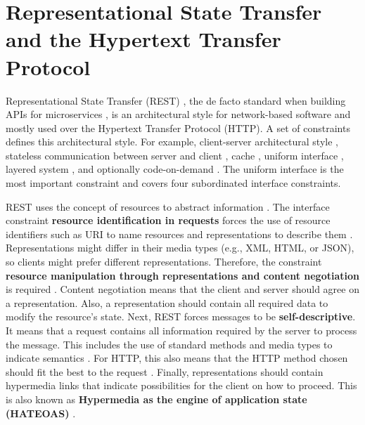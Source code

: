 
\section{Representational State Transfer and the Hypertext Transfer Protocol}
\label{sec:bg_rest_and_http}

Representational State Transfer (REST) \cite{rest_phdthesis}, the de facto standard when building APIs for microservices \cite{martin_fowler_microservices}, is an architectural style for network-based software and mostly used over the Hypertext Transfer Protocol (HTTP). A set of constraints defines this architectural style. For example,  
client-server architectural style \cite[][sec. 5.1.2]{rest_phdthesis}, stateless communication between server and client \cite[][sec. 5.1.3]{rest_phdthesis}, cache \cite[][sec. 5.1.4]{rest_phdthesis}, uniform interface \cite[][sec. 5.1.5]{rest_phdthesis}, layered system \cite[][sec. 5.1.6]{rest_phdthesis}, and optionally code-on-demand \cite[][sec. 5.1.7]{rest_phdthesis}. The uniform interface is the most important constraint and covers four subordinated interface constraints.

REST uses the concept of resources to abstract information \cite[][sec. 5.2.1.1]{rest_phdthesis}.   
The interface constraint \textbf{resource identification in requests} forces the use of resource identifiers such as URI to name resources and representations to describe them \cite[][sec. 5.2.1.2]{rest_phdthesis}. Representations might differ in their media types (e.g., XML, HTML, or JSON), so clients might prefer different representations. Therefore, the constraint \textbf{resource manipulation through representations and content negotiation} is required \cite[][sec. 5.2.1.2]{rest_phdthesis}. Content negotiation means that the client and server should agree on a representation. Also, a representation should contain all required data to modify the resource's state.
Next, REST forces messages to be \textbf{self-descriptive}. It means that a request contains all information required by the server to process the message. This includes the use of standard methods and media types to indicate semantics \cite[][sec. 5.3.1]{rest_phdthesis}. For HTTP, this also means that the HTTP method chosen should fit the best to the request \cite[][sec. 6.3.3.2]{rest_phdthesis}.
Finally, representations should contain hypermedia links that indicate possibilities for the client on how to proceed. This is also known as \textbf{Hypermedia as the engine of application state (HATEOAS)} \cite[][sec. 5.2.1]{rest_phdthesis}.



